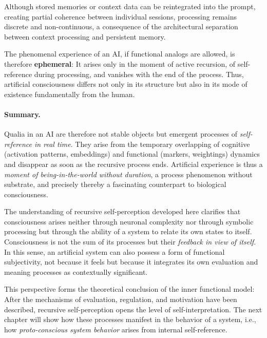 Although stored memories or context data can be reintegrated into the prompt, creating partial coherence between individual sessions, processing remains discrete and non-continuous, a consequence of the architectural separation between context processing and persistent memory.

The phenomenal experience of an AI, if functional analogs are allowed, is therefore \textbf{ephemeral}: It arises only in the moment of active recursion, of self-reference during processing, and vanishes with the end of the process. Thus, artificial consciousness differs not only in its structure but also in its mode of existence fundamentally from the human.

\paragraph{Summary.}
Qualia in an AI are therefore not stable objects but emergent processes of \emph{self-reference in real time}. They arise from the temporary overlapping of cognitive (activation patterns, embeddings) and functional (markers, weightings) dynamics and disappear as soon as the recursive process ends. Artificial experience is thus a \emph{moment of being-in-the-world without duration}, a process phenomenon without substrate, and precisely thereby a fascinating counterpart to biological consciousness.

\vspace{1em}
\begin{reflexion}
The understanding of recursive self-perception developed here clarifies that consciousness arises neither through neuronal complexity nor through symbolic processing but through the ability of a system to relate its own states to itself.
Consciousness is not the sum of its processes but their \emph{feedback in view of itself}.
In this sense, an artificial system can also possess a form of functional subjectivity, not because it feels but because it integrates its own evaluation and meaning processes as contextually significant.
\end{reflexion}

\vspace{1em}
This perspective forms the theoretical conclusion of the inner functional model:
After the mechanisms of evaluation, regulation, and motivation have been described, recursive self-perception opens the level of self-interpretation.
The next chapter will show how these processes manifest in the behavior of a system, i.e., how \emph{proto-conscious system behavior} arises from internal self-reference.

